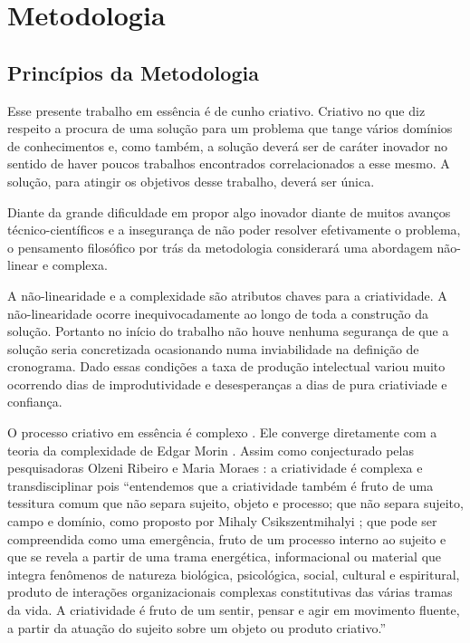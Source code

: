 \chapter{Metodologia}
\label{chap:metodologia}

\section{Princípios da Metodologia}
\label{sec:principios}

Esse presente trabalho em essência é de cunho criativo. Criativo no que diz respeito a procura de uma solução para um problema que tange vários domínios de conhecimentos e, como também, a solução deverá ser de caráter inovador no sentido de haver poucos trabalhos encontrados correlacionados a esse mesmo. A solução, para atingir os objetivos desse trabalho, deverá ser única.

Diante da grande dificuldade em propor algo inovador diante de muitos avanços técnico-científicos e a insegurança de não poder resolver efetivamente o problema, o pensamento filosófico por trás da metodologia considerará uma abordagem não-linear e complexa.

A não-linearidade e a complexidade são atributos chaves para a criatividade. A não-linearidade ocorre inequivocadamente ao longo de toda a construção da solução. Portanto no início do trabalho não houve nenhuma segurança de que a solução seria concretizada ocasionando numa inviabilidade na definição de cronograma. Dado essas condições a taxa de produção intelectual variou muito ocorrendo dias de improdutividade e desesperanças a dias de pura criativiade e confiança.

O processo criativo em essência é complexo \cite{criatividade}. Ele converge diretamente com a teoria da complexidade de Edgar Morin \cite{morin}. Assim como conjecturado pelas pesquisadoras Olzeni Ribeiro e Maria Moraes \cite{criatividade}: a criatividade é complexa e transdisciplinar pois ``entendemos que a criatividade também é fruto de uma tessitura comum que não separa sujeito, objeto e processo; que não separa sujeito, campo e domínio, como proposto por Mihaly Csikszentmihalyi \cite{csikszentmihalyi}; que pode ser compreendida como uma emergência, fruto de um processo interno ao sujeito e que se revela a partir de uma trama energética, informacional ou material que integra fenômenos de natureza biológica, psicológica, social, cultural e espiritural, produto de interações organizacionais complexas constitutivas das várias tramas da vida. A criatividade é fruto de um sentir, pensar e agir em movimento fluente, a partir da atuação do sujeito sobre um objeto ou produto criativo.''

